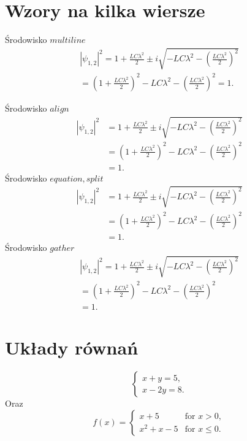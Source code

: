 \documentclass[a4paper, 12pt]{amsart}
\begin{document}
\section{Wzory na kilka wiersze}
Środowisko $multiline$\\
\begin{multline}
|\psi_{1,2}|^2 = 1 + \frac{LC \lambda^2}{2} \pm i \sqrt{-LC \lambda^2 - \left( \frac{LC \lambda^2}{2} \right)^2} \\
= \left( 1 + \frac{LC \lambda^2}{2} \right)^2 - LC \lambda^2 - \left( \frac{LC \lambda^2}{2} \right)^2 = 1.
\end{multline}


Środowisko $align$
\begin{align}
|\psi_{1,2}|^2 &=  1 + \frac{LC \lambda^2}{2} \pm i \sqrt{-LC \lambda^2 - \left( \frac{LC \lambda^2}{2} \right)^2} \tag{3}  \\
&= \left( 1 + \frac{LC \lambda^2}{2} \right)^2 - LC \lambda^2 - \left( \frac{LC \lambda^2}{2} \right)^2 \tag{4} \\
&= 1.
\end{align}
Środowisko $equation, split$
\begin{equation}
\begin{split}
|\psi_{1,2}|^2 &= 1 + \frac{LC \lambda^2}{2} \pm i \sqrt{-LC \lambda^2 - \left( \frac{LC \lambda^2}{2} \right)^2} \\
&= \left( 1 + \frac{LC \lambda^2}{2} \right)^2 - LC \lambda^2 - \left( \frac{LC \lambda^2}{2} \right)^2 \\
&= 1.
\end{split}
\end{equation}
Środowisko $gather$
\begin{gather}
|\psi_{1,2}|^2 = 1 + \frac{LC \lambda^2}{2} \pm i \sqrt{-LC \lambda^2 - \left( \frac{LC \lambda^2}{2} \right)^2} \tag{6} \\
= \left( 1 + \frac{LC \lambda^2}{2} \right)^2 - LC \lambda^2 - \left( \frac{LC \lambda^2}{2} \right)^2 \tag{7} \\
= 1.
\end{gather}



\section{Układy równań}
\begin{equation}
\begin{cases}
x + y = 5, \\
x - 2y = 8.
\end{cases}
\end{equation}
Oraz
\begin{equation}
f(x) =
\begin{cases}
x + 5 & \text{for } x > 0, \\
x^2 + x - 5 & \text{for } x \leq 0.
\end{cases}
\end{equation}
\end{document}
